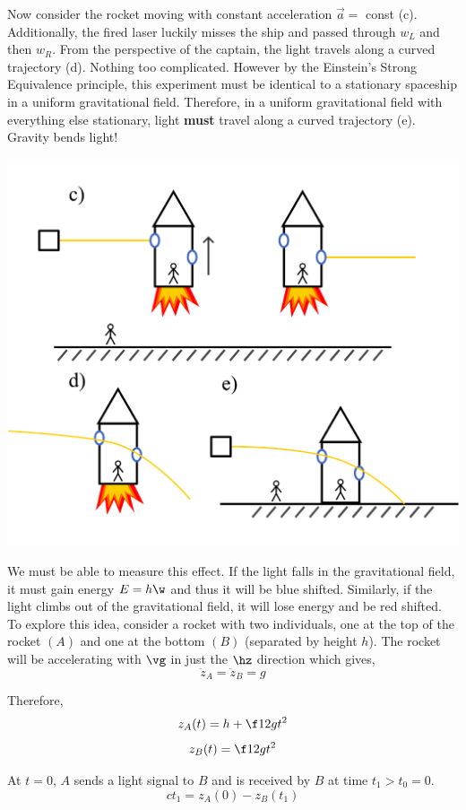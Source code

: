 \documentclass{article}
\begin{document}
Now consider the rocket moving with constant acceleration $\vec{a} =$ const (c). Additionally, the fired laser luckily misses the ship and passed through $w_L$ and then $w_R$. From the perspective of the captain, the light travels along a curved trajectory (d). Nothing too complicated. However by the Einstein's Strong Equivalence principle, this experiment must be identical to a stationary spaceship in a uniform gravitational field. Therefore, in a uniform gravitational field with everything else stationary, light \textbf{must} travel along a curved trajectory (e). Gravity bends light!

\begin{center}
    \includegraphics[scale=0.7]{figures/bend_light/constant_a.pdf}
\end{center}

We must be able to measure this effect. If the light falls in the gravitational field, it must gain energy $E = h \w$ and thus it will be blue shifted. Similarly, if the light climbs out of the gravitational field, it will lose energy and be red shifted. To explore this idea, consider a rocket with two individuals, one at the top of the rocket $(A)$ and one at the bottom $(B)$ (separated by height $h$). The rocket will be accelerating with $\vg$ in just the $\hz$ direction which gives,
\[ \ddot{z}_A = \ddot{z}_B = g \]

Therefore,
\[ z_A(t) = h + \f12 g t^2 \]
\[ z_B(t) = \f12 g t^2 \]

At $t=0$, $A$ sends a light signal to $B$ and is received by $B$ at time $t_1 > t_0 = 0$.
\[ ct_1 = z_A(0) - z_B(t_1) \]
\end{document}
